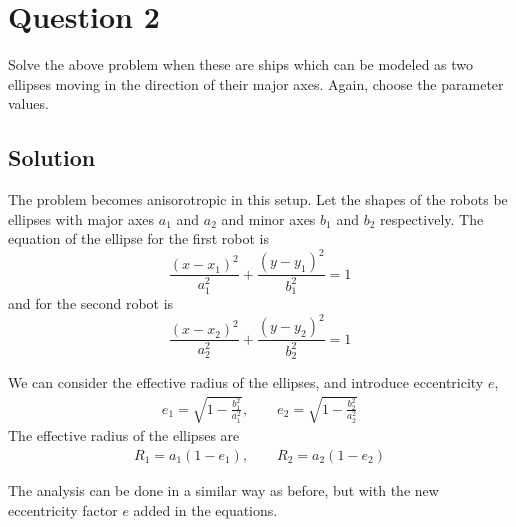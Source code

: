 \section*{Question 2}

Solve the above problem when these are ships which can be modeled as two ellipses moving in
the direction of their major axes.
Again, choose the parameter values.

\subsection*{Solution}

The problem becomes anisorotropic in this setup.
Let the shapes of the robots be ellipses with major axes \( a_1 \) and \( a_2 \) and minor axes \( b_1 \) and \( b_2 \) respectively.
The equation of the ellipse for the first robot is
\begin{equation*}
    \frac{(x - x_1)^2}{a_1^2} + \frac{(y - y_1)^2}{b_1^2} = 1
\end{equation*}
and for the second robot is
\begin{equation*}
    \frac{(x - x_2)^2}{a_2^2} + \frac{(y - y_2)^2}{b_2^2} = 1
\end{equation*}

We can consider the effective radius of the ellipses, and introduce eccentricity \( e \),
\begin{align*}
    e_1 = \sqrt{1 - \frac{b_1^2}{a_1^2}}, \qquad
    e_2 = \sqrt{1 - \frac{b_2^2}{a_2^2}}
\end{align*}
The effective radius of the ellipses are
\begin{align*}
    R_1 = a_1(1 - e_1), \qquad
    R_2 = a_2(1 - e_2)
\end{align*}

The analysis can be done in a similar way as before, but with the new eccentricity factor \( e \) added in the equations.
